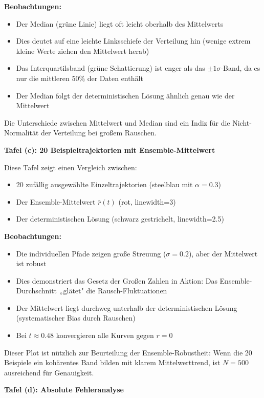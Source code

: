 \documentclass[a4paper,12pt]{article}
\theoremstyle{definition}
\begin{document}
\textbf{Beobachtungen:}
\begin{itemize}
	\item Der Median (grüne Linie) liegt oft leicht oberhalb des Mittelwerts
	\item Dies deutet auf eine leichte Linksschiefe der Verteilung hin (wenige extrem kleine Werte ziehen den Mittelwert herab)
	\item Das Interquartilsband (grüne Schattierung) ist enger als das $\pm 1\sigma$-Band, da es nur die mittleren 50\% der Daten enthält
	\item Der Median folgt der deterministischen Lösung ähnlich genau wie der Mittelwert
\end{itemize}

Die Unterschiede zwischen Mittelwert und Median sind ein Indiz für die Nicht-Normalität der Verteilung bei großem Rauschen.

\textbf{Tafel (c): 20 Beispieltrajektorien mit Ensemble-Mittelwert}

Diese Tafel zeigt einen Vergleich zwischen:
\begin{itemize}
	\item 20 zufällig ausgewählte Einzeltrajektorien (steelblau mit $\alpha = 0.3$)
	\item Der Ensemble-Mittelwert $\bar{r}(t)$ (rot, linewidth=3)
	\item Der deterministischen Lösung (schwarz gestrichelt, linewidth=2.5)
\end{itemize}

\textbf{Beobachtungen:}
\begin{itemize}
	\item Die individuellen Pfade zeigen große Streuung ($\sigma = 0.2$), aber der Mittelwert ist robust
	\item Dies demonstriert das Gesetz der Großen Zahlen in Aktion: Das Ensemble-Durchschnitt „glätet" die Rausch-Fluktuationen
	\item Der Mittelwert liegt durchweg unterhalb der deterministischen Lösung (systematischer Bias durch Rauschen)
	\item Bei $t \approx 0.48$ konvergieren alle Kurven gegen $r = 0$
\end{itemize}

Dieser Plot ist nützlich zur Beurteilung der Ensemble-Robustheit: Wenn die 20 Beispiele ein kohärentes Band bilden mit klarem Mittelwerttrend, ist $N = 500$ ausreichend für Genauigkeit.

\textbf{Tafel (d): Absolute Fehleranalyse}
\end{document}
